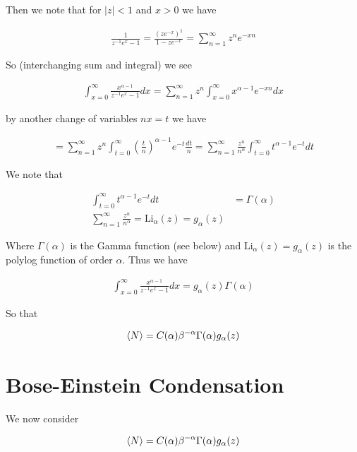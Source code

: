 \documentclass[12pt]{article}
\begin{document}
Then we note that for $|z|<1$ and $x>0$ we have

\begin{align}
\frac{1}{z^{-1}e^x -1} = \frac{\left(z e^{-x}\right)^1}{1-z e^{-x}} = \sum_{n=1}^{\infty} z^n e^{-xn}
\end{align}

So (interchanging sum and integral) we see

\begin{align}
\int_{x=0}^{\infty} \frac{x^{\alpha-1}}{z^{-1}e^x-1} dx = \sum_{n=1}^{\infty} z^n \int_{x=0}^{\infty} x^{\alpha-1} e^{-xn} dx
\end{align}

by another change of variables $nx=t$ we have

\begin{align}
= \sum_{n=1}^{\infty} z^n\int_{t=0}^{\infty} \left(\frac{t}{n}\right)^{\alpha-1} e^{-t} \frac{dt}{n} = \sum_{n=1}^{\infty}\frac{z^n}{n^{\alpha}}\int_{t=0}^{\infty} t^{\alpha-1}e^{-t}dt
\end{align}

We note that

\begin{align}
\int_{t=0}^{\infty} t^{\alpha-1} e^{-t} dt &= \Gamma(\alpha)\\
\sum_{n=1}^{\infty} \frac{z^n}{n^{\alpha}} = \text{Li}_{\alpha}(z) = g_{\alpha}(z)
\end{align}

Where $\Gamma(\alpha)$ is the Gamma function (see below) and $\text{Li}_{\alpha}(z) = g_{\alpha}(z)$ is the polylog function of order $\alpha$. Thus we have

\begin{align}
\int_{x=0}^{\infty} \frac{x^{\alpha-1}}{z^{-1}e^x -1} dx = g_{\alpha}(z)\Gamma(\alpha)
\end{align}

So that

\begin{align}
\Braket{N} = C(\alpha) \beta^{-\alpha}\Gamma(\alpha)g_{\alpha}(z)
\end{align}

\section{Bose-Einstein Condensation}

We now consider

\begin{align}
\braket{N} = C(\alpha) \beta^{-\alpha}\Gamma(\alpha)g_{\alpha}(z)
\end{align}
\end{document}
